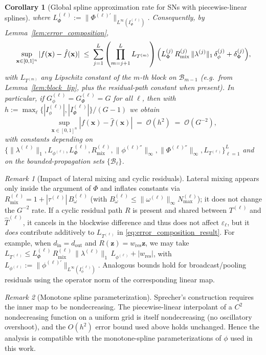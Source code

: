 \documentclass{article}
\theoremstyle{plain}
\newtheorem{corollary}{Corollary}
\theoremstyle{definition}
\theoremstyle{remark}
\newtheorem{remark}{Remark}
\begin{document}
\begin{corollary}[Global spline approximation rate for SNs with piecewise-linear splines]
where $L_{\Phi}^{(\ell)}:=\|\Phi^{(\ell)'}\|_{L^\infty(I_\Phi^{(\ell)})}$. Consequently, by Lemma~\ref{lem:error_composition},
$$\sup_{\mathbf{x}\in[0,1]^n}|f(\mathbf{x})-\hat f(\mathbf{x})|
\;\le\;
\sum_{j=1}^{L}\left(\prod_{m=j+1}^{L}L_{T^{(m)}}\right)\Bigl(L_{\Phi}^{(j)}\,R_{\mathrm{mix}}^{(j)}\,\|\lambda^{(j)}\|_{1}\,\delta_\phi^{(j)}+\delta_\Phi^{(j)}\Bigr),$$
with $L_{T^{(m)}}$ any Lipschitz constant of the $m$-th block on $\mathcal{B}_{m-1}$ (e.g.\ from Lemma~\ref{lem:block_lip}, plus the residual-path constant when present). In particular, if $G_\phi^{(\ell)}=G_\Phi^{(\ell)}=G$ for all $\ell$, then with $h:=\max_\ell\{|I_\phi^{(\ell)}|,|I_\Phi^{(\ell)}|\}/(G-1)$ we obtain
$$\sup_{\mathbf{x}\in[0,1]^n}|f(\mathbf{x})-\hat f(\mathbf{x})|
\;=\; \mathcal{O}\!\left(h^2\right)
\;=\; \mathcal{O}\!\left(G^{-2}\right),$$
with constants depending on $\{\|\lambda^{(\ell)}\|_{1},L_{\phi^{(\ell)}},L_{\Phi}^{(\ell)},R_{\mathrm{mix}}^{(\ell)},\|\phi^{(\ell)''}\|_\infty,\|\Phi^{(\ell)''}\|_\infty,L_{T^{(\ell)}}\}_{\ell=1}^L$ and on the bounded-propagation sets $\{\mathcal{B}_\ell\}$.
\end{corollary}

\begin{remark}[Impact of lateral mixing and cyclic residuals]
Lateral mixing appears only inside the argument of $\Phi$ and inflates constants via $R_{\mathrm{mix}}^{(\ell)}=1+|\tau^{(\ell)}|\,B_\omega^{(\ell)}$ (with $B_\omega^{(\ell)}\le \|\omega^{(\ell)}\|_\infty N_{\max}^{(\ell)}$); it does not change the $G^{-2}$ rate. If a cyclic residual path $R$ is present and shared between $T^{(\ell)}$ and $\hat T^{(\ell)}$, it cancels in the blockwise difference and thus does not affect $\varepsilon_\ell$, but it \emph{does} contribute additively to $L_{T^{(\ell)}}$ in \eqref{eq:error_composition_result}. For example, when $d_{\mathrm{in}}=d_{\mathrm{out}}$ and $R(\mathbf{z})=w_{\mathrm{res}}\mathbf{z}$, we may take $L_{T^{(\ell)}}\le L_{\Phi}^{(\ell)}\,R_{\mathrm{mix}}^{(\ell)}\,\|\lambda^{(\ell)}\|_{1}\,L_{\phi^{(\ell)}} + |w_{\mathrm{res}}|$, with $L_{\phi^{(\ell)}}:=\|\phi^{(\ell)'}\|_{L^\infty(I_\phi^{(\ell)})}$. Analogous bounds hold for broadcast/pooling residuals using the operator norm of the corresponding linear map.
\end{remark}

\begin{remark}[Monotone spline parameterization]
Sprecher's construction requires the inner map to be nondecreasing. The piecewise-linear interpolant of a $C^2$ nondecreasing function on a uniform grid is itself nondecreasing (no oscillatory overshoot), and the $O(h^2)$ error bound used above holds unchanged. Hence the analysis is compatible with the monotone-spline parameterizations of $\phi$ used in this work.
\end{remark}
\end{document}
